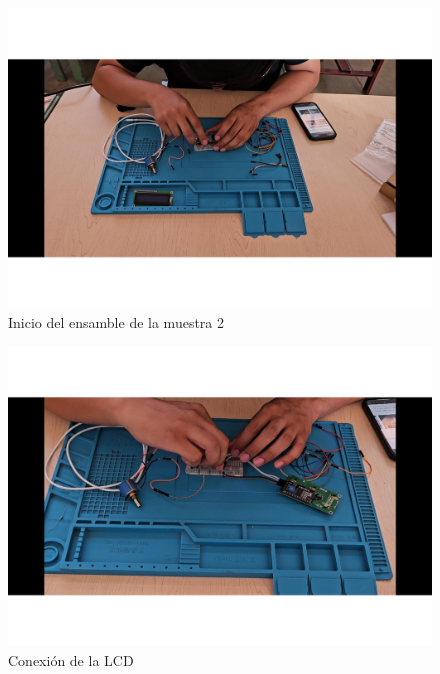      
    \begin{figure}[H]
        \centering
        \includegraphics[trim = {25mm 25mm 25mm 10mm},clip,scale=0.3]{22/Img/ev1.pdf}
        \caption{Inicio del ensamble de la muestra 2}
        \label{fig:ev1}
    \end{figure}
    
    \begin{figure}[H]
        \centering
        \includegraphics[trim = {25mm 25mm 25mm 10mm},clip,scale=0.3]{22/Img/ev2.pdf}
        \caption{Conexión de la LCD}
        \label{fig:ev2}
    \end{figure}
    
